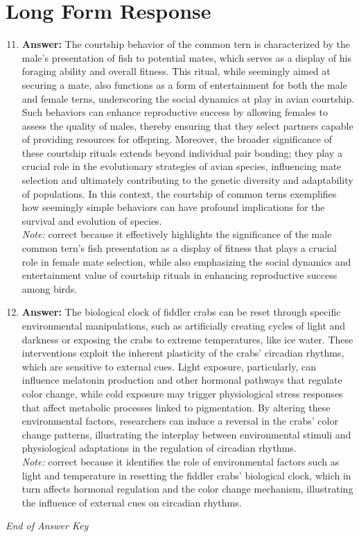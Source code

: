 \documentclass[12pt]{article}
\begin{document}
\section*{Long Form Response}
\begin{enumerate}[label=\arabic*.]
\setcounter{enumi}{10}
\item \textbf{Answer:} The courtship behavior of the common tern is characterized by the male's presentation of fish to potential mates, which serves as a display of his foraging ability and overall fitness. This ritual, while seemingly aimed at securing a mate, also functions as a form of entertainment for both the male and female terns, underscoring the social dynamics at play in avian courtship. Such behaviors can enhance reproductive success by allowing females to assess the quality of males, thereby ensuring that they select partners capable of providing resources for offspring. Moreover, the broader significance of these courtship rituals extends beyond individual pair bonding; they play a crucial role in the evolutionary strategies of avian species, influencing mate selection and ultimately contributing to the genetic diversity and adaptability of populations. In this context, the courtship of common terns exemplifies how seemingly simple behaviors can have profound implications for the survival and evolution of species.
\\ \textit{Note:} correct because it effectively highlights the significance of the male common tern's fish presentation as a display of fitness that plays a crucial role in female mate selection, while also emphasizing the social dynamics and entertainment value of courtship rituals in enhancing reproductive success among birds.
\item \textbf{Answer:} The biological clock of fiddler crabs can be reset through specific environmental manipulations, such as artificially creating cycles of light and darkness or exposing the crabs to extreme temperatures, like ice water. These interventions exploit the inherent plasticity of the crabs' circadian rhythms, which are sensitive to external cues. Light exposure, particularly, can influence melatonin production and other hormonal pathways that regulate color change, while cold exposure may trigger physiological stress responses that affect metabolic processes linked to pigmentation. By altering these environmental factors, researchers can induce a reversal in the crabs' color change patterns, illustrating the interplay between environmental stimuli and physiological adaptations in the regulation of circadian rhythms.
\\ \textit{Note:} correct because it identifies the role of environmental factors such as light and temperature in resetting the fiddler crabs' biological clock, which in turn affects hormonal regulation and the color change mechanism, illustrating the influence of external cues on circadian rhythms.
\end{enumerate}

\vfill
\noindent\textit{End of Answer Key}
\end{document}
